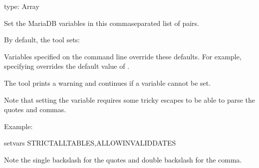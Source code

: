\documentclass[letterpaper,10pt,english]{sphinxmanual}
\begin{document}
\begin{fulllineitems}
\label{\detokenize{mariadb-schema-change:cmdoption-mariadb-schema-change-set-vars}}
\sphinxAtStartPar
type: Array

\sphinxAtStartPar
Set the MariaDB variables in this comma\sphinxhyphen{}separated list of  pairs.

\sphinxAtStartPar
By default, the tool sets:

\begin{sphinxVerbatim}[commandchars=\\\{\}]
\end{sphinxVerbatim}

\sphinxAtStartPar
Variables specified on the command line override these defaults.  For
example, specifying  overrides the default
value of .

\sphinxAtStartPar
The tool prints a warning and continues if a variable cannot be set.

\sphinxAtStartPar
Note that setting the  variable requires some tricky escapes
to be able to parse the quotes and commas.

\sphinxAtStartPar
Example:

\begin{sphinxVerbatim}[commandchars=\\\{\}]
\PYGZhy{}\PYGZhy{}set\PYGZhy{}vars STRICT\PYGZus{}ALL\PYGZus{}TABLES,ALLOW\PYGZus{}INVALID\PYGZus{}DATES
\end{sphinxVerbatim}

\sphinxAtStartPar
Note the single backslash for the quotes and double backslash for the comma.

\end{fulllineitems}

\end{document}
